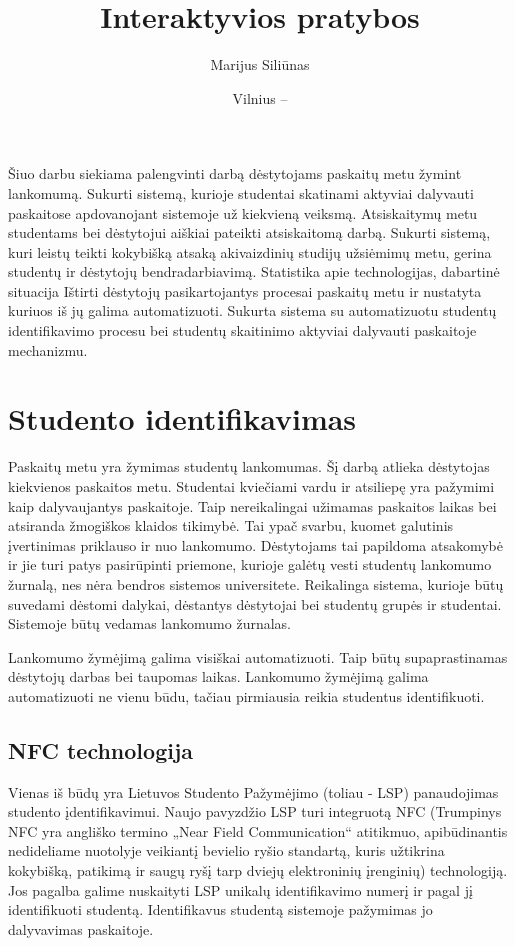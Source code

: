\documentclass{VUMIFPSkursinis}
\title{Interaktyvios pratybos}
\author{Marijus Siliūnas}
\date{Vilnius – \the\year}
\begin{document}
\maketitle

\tableofcontents

Šiuo darbu siekiama palengvinti darbą dėstytojams paskaitų metu žymint lankomumą. Sukurti sistemą, kurioje studentai skatinami aktyviai dalyvauti paskaitose apdovanojant sistemoje už kiekvieną veiksmą. Atsiskaitymų metu studentams bei dėstytojui aiškiai pateikti atsiskaitomą darbą.
Sukurti sistemą, kuri leistų teikti kokybišką atsaką akivaizdinių studijų užsiėmimų metu, gerina studentų ir dėstytojų bendradarbiavimą.
Statistika apie technologijas, dabartinė situacija
Ištirti dėstytojų pasikartojantys procesai paskaitų metu ir nustatyta kuriuos iš jų galima automatizuoti. Sukurta sistema su automatizuotu studentų identifikavimo procesu bei studentų skaitinimo aktyviai dalyvauti paskaitoje mechanizmu. 

\section{Studento identifikavimas}
Paskaitų metu yra žymimas studentų lankomumas. Šį darbą atlieka dėstytojas kiekvienos paskaitos metu. Studentai kviečiami vardu ir atsiliepę yra pažymimi kaip dalyvaujantys paskaitoje. Taip nereikalingai užimamas paskaitos laikas bei atsiranda žmogiškos klaidos tikimybė. Tai ypač svarbu, kuomet galutinis įvertinimas priklauso ir nuo lankomumo. Dėstytojams tai papildoma atsakomybė ir jie turi patys pasirūpinti priemone, kurioje galėtų vesti studentų lankomumo žurnalą, nes nėra bendros sistemos universitete.  Reikalinga sistema, kurioje būtų suvedami dėstomi dalykai, dėstantys dėstytojai bei studentų grupės ir studentai. Sistemoje būtų vedamas lankomumo žurnalas.

Lankomumo žymėjimą galima visiškai automatizuoti. Taip būtų supaprastinamas dėstytojų darbas bei taupomas laikas. Lankomumo žymėjimą galima automatizuoti ne vienu būdu, tačiau pirmiausia reikia studentus identifikuoti.

\subsection{NFC technologija}
Vienas iš būdų yra Lietuvos Studento Pažymėjimo (toliau - LSP) panaudojimas studento įdentifikavimui. Naujo pavyzdžio LSP turi integruotą NFC (Trumpinys NFC yra angliško termino „Near Field Communication“ atitikmuo, apibūdinantis nedideliame nuotolyje veikiantį bevielio ryšio standartą, kuris užtikrina kokybišką, patikimą ir saugų ryšį tarp dviejų elektroninių įrenginių) technologiją.  Jos pagalba galime nuskaityti LSP unikalų identifikavimo numerį ir pagal jį identifikuoti studentą. Identifikavus studentą sistemoje pažymimas jo dalyvavimas paskaitoje.
\end{document}
